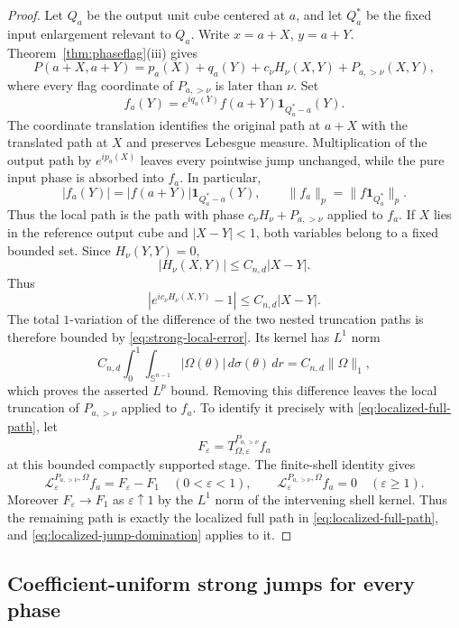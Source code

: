\documentclass[11pt]{article}
\numberwithin{equation}{section}
\theoremstyle{remark}
\theoremstyle{definition}
\newcommand{\Sph}{\mathbb S}
\newcommand{\cL}{\mathcal L}
\newcommand{\norm}[1]{\lVert #1\rVert}
\begin{document}
\begin{proof}
Let $Q_a$ be the output unit cube centered at \(a\), and let $Q_a^*$ be
the fixed input enlargement relevant to $Q_a$.  Write \(x=a+X\),
\(y=a+Y\).  Theorem~\ref{thm:phaseflag}(iii) gives
\[
 P(a+X,a+Y)=p_a(X)+q_a(Y)+c_\nu H_\nu(X,Y)
 +P_{a,>\nu}(X,Y),
\]
where every flag coordinate of \(P_{a,>\nu}\) is later than \(\nu\).
Set
\[
 f_a(Y)=e^{iq_a(Y)}f(a+Y)\mathbf1_{Q_a^*-a}(Y).
\]
The coordinate translation identifies the original path at $a+X$ with
the translated path at $X$ and preserves Lebesgue measure.  Multiplication
of the output path by $e^{ip_a(X)}$ leaves every pointwise jump unchanged,
while the pure input phase is absorbed into $f_a$.  In particular,
\[
 |f_a(Y)|=|f(a+Y)|\mathbf1_{Q_a^*-a}(Y),
 \qquad
 \norm{f_a}_p=\norm{f\mathbf1_{Q_a^*}}_p.
\]
Thus the local path is the path with phase
$c_\nu H_\nu+P_{a,>\nu}$ applied to $f_a$.  If
\(X\) lies in the reference output cube and \(|X-Y|<1\), both variables
belong to a fixed bounded set.  Since \(H_\nu(Y,Y)=0\),
\begin{equation}\label{eq:strong-local-H-bound}
 |H_\nu(X,Y)|\leq C_{n,d}|X-Y|.
\end{equation}
Thus
\[
 |e^{ic_\nu H_\nu(X,Y)}-1|\leq C_{n,d}|X-Y|.
\]
The total \(1\)-variation of the difference of the two nested truncation
paths is therefore bounded by \eqref{eq:strong-local-error}.  Its kernel
has \(L^1\) norm
\[
 C_{n,d}\int_0^1\int_{\Sph^{n-1}}|\Omega(\theta)|
 \,d\sigma(\theta)\,dr
 =C_{n,d}\norm\Omega_1,
\]
which proves the asserted \(L^p\) bound.  Removing this difference leaves
the local truncation of \(P_{a,>\nu}\) applied to $f_a$.  To identify it
precisely with \eqref{eq:localized-full-path}, let
\[
 F_\varepsilon
 =T^{P_{a,>\nu}}_{\Omega,\varepsilon}f_a
\]
at this bounded compactly supported stage.  The finite-shell identity
gives
\[
 \cL^{P_{a,>\nu},\Omega}_\varepsilon f_a
 =F_\varepsilon-F_1\quad(0<\varepsilon<1),
 \qquad
 \cL^{P_{a,>\nu},\Omega}_\varepsilon f_a=0\quad(\varepsilon\ge1).
\]
Moreover $F_\varepsilon\to F_1$ as $\varepsilon\uparrow1$ by the
$L^1$ norm of the intervening shell kernel.  Thus the remaining path is
exactly the localized full path in \eqref{eq:localized-full-path}, and
\eqref{eq:localized-jump-domination} applies to it.
\end{proof}

\subsection{Coefficient-uniform strong jumps for every phase}
\end{document}
